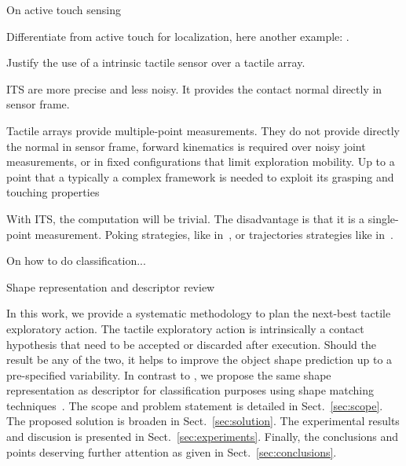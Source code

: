 On active touch sensing \citet{Prescott2011Active}

Differentiate from active touch for localization, here another example: \citet{Hebert2013Next}.

Justify the use of a intrinsic tactile sensor over a tactile array.

ITS are more precise and less noisy. It provides the contact normal directly in sensor frame.

Tactile arrays provide multiple-point measurements. They do not provide directly the normal in sensor frame, forward kinematics is required over noisy joint measurements, or in fixed configurations that limit exploration mobility. Up to a point that a typically a complex framework is needed to exploit its grasping and touching properties %

With ITS, the computation will be trivial. The disadvantage is that it is a single-point measurement. Poking strategies, like in~\citet{Petrovskaya2011Global}, or trajectories strategies like in~\citet{Rosales2014Active}.



On how to do classification...

Shape representation and descriptor review \citet{Zhang2004Review}

In this work, we provide a systematic methodology to plan the next-best tactile exploratory action. The tactile exploratory action is intrinsically a contact hypothesis that need to be accepted or discarded after execution. Should the result be any of the two, it helps to improve the object shape prediction up to a pre-specified variability. In contrast to \citet{Bjorkman2013Enhancing}, we propose the same shape representation as descriptor for classification purposes using shape matching techniques~\citep{Belongie2002Shape}. The scope and problem statement is detailed in Sect.~\ref{sec:scope}. The proposed solution is broaden in Sect.~\ref{sec:solution}. The experimental results and discusion is presented in Sect.~\ref{sec:experiments}. Finally, the conclusions and points deserving further attention as given in Sect.~\ref{sec:conclusions}.
